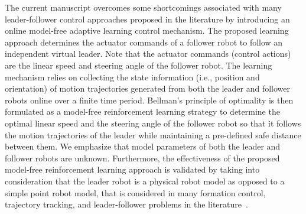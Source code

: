 \documentclass[conference]{IEEEtran}
\begin{document}
The current manuscript overcomes some shortcomings associated with many leader-follower control approaches proposed in the literature by introducing an online model-free adaptive learning control mechanism. The proposed learning approach determines the actuator commands of a follower robot to follow an independent virtual leader. Note that the actuator commands (control actions) are the linear speed and steering angle of the follower robot. The learning mechanism relies on collecting the state information (i.e., position and orientation) of motion trajectories generated from both the leader and follower robots online over a finite time period. Bellman's principle of optimality is then formulated as a model-free reinforcement learning strategy to determine the optimal linear speed and the steering angle of the follower robot so that it follows the motion trajectories of the leader while maintaining a pre-defined safe distance between them. We emphasize that model parameters of both the leader and follower robots are unknown. Furthermore, the effectiveness of the proposed model-free reinforcement learning approach is validated by taking into consideration that the leader robot is a physical robot model as opposed to a simple point robot model, that is considered in many formation control, trajectory tracking, and leader-follower problems in the literature~\cite{Marshall2004}. 


\end{document}
